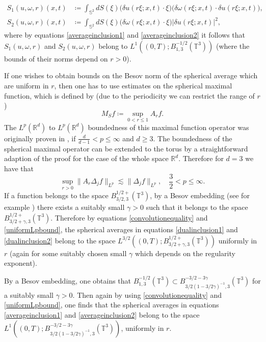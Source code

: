 \documentclass[12pt,a4paper]{article}
\theoremstyle{definition}
\theoremstyle{remark}
\numberwithin{equation}{section}
\begin{document}
\begin{align}
S_1 (u, \omega, r) (x,t) &\coloneqq \int_{\mathbb{S}^2} d S (\xi) \big( \delta u (r \xi;x,t) \cdot \xi \big) \big( \delta \omega (r \xi;x,t) \cdot \delta u (r \xi;x,t) \big), \\
S_2 (u, \omega, r) (x,t) &\coloneqq \int_{\mathbb{S}^2} d S (\xi) \big( \delta \omega (r \xi;x,t) \cdot \xi \big) \lvert \delta u (r \xi;x,t) \rvert^2,
\end{align} 
where by equations \eqref{averageinclusion1} and \eqref{averageinclusion2} it follows that $S_1 (u, \omega, r)$ and $S_2 (u, \omega, r)$ belong to $L^1 ((0,T); B^{-1/2}_{1,3} (\mathbb{T}^3))$ (where the bounds of their norms depend on $r > 0$).


If one wishes to obtain bounds on the Besov norm of the spherical average which are uniform in $r$, then one has to use estimates on the spherical maximal function, which is defined by (due to the periodicity we can restrict the range of $r$)
\begin{equation}
M_S f \coloneqq \sup_{0 < r \leq 1} A_r f. 
\end{equation}
The $L^p (\mathbb{R}^d)$ to $L^p (\mathbb{R}^d)$ boundedness of this maximal function operator was originally proven in \cite{stein}, if $\frac{d}{d-1} < p \leq \infty$ and $d \geq 3$. The boundedness of the spherical maximal operator can be extended to the torus by a straightforward adaption of the proof for the case of the whole space $\mathbb{R}^d$. Therefore for $d = 3$ we have that
\begin{equation} \label{uniformLpbound}
\sup_{r > 0} \lVert A_r \Delta_j f \rVert_{L^p} \lesssim \lVert \Delta_j f \rVert_{L^p}, \quad \frac{3}{2} < p \leq \infty.
\end{equation}
If a function belongs to the space $B^{1/2+}_{3/2,3} (\mathbb{T}^3)$, by a Besov embedding (see for example \cite{bahouri}) there exists a suitably small $\gamma > 0$ such that it belongs to the space $B^{1/2+}_{3/2+\gamma,3} (\mathbb{T}^3)$. Therefore by equations \eqref{convolutionequality} and \eqref{uniformLpbound}, the spherical averages in equations \eqref{dualinclusion1} and \eqref{dualinclusion2} belong to the space $L^{3/2} ((0,T); B^{1/2+}_{3/2+\gamma,3} (\mathbb{T}^3))$ uniformly in $r$ (again for some suitably chosen small $\gamma$ which depends on the regularity exponent).

By a Besov embedding, one obtains that $B^{-1/2}_{1,3} (\mathbb{T}^3) \subset B^{-3/2 - 3 \gamma}_{3/2 ( 1 - 3/2 \gamma)^{-1}, 3} (\mathbb{T}^3)$ for a suitably small $\gamma > 0$. Then again by using \eqref{convolutionequality} and \eqref{uniformLpbound}, one finds that the spherical averages in equations \eqref{averageinclusion1} and \eqref{averageinclusion2} belong to the space $L^1 ( (0,T); B^{-3/2 - 3 \gamma}_{3/2 ( 1 - 3/2 \gamma)^{-1}, 3} (\mathbb{T}^3))$, uniformly in $r$. 
\end{document}
